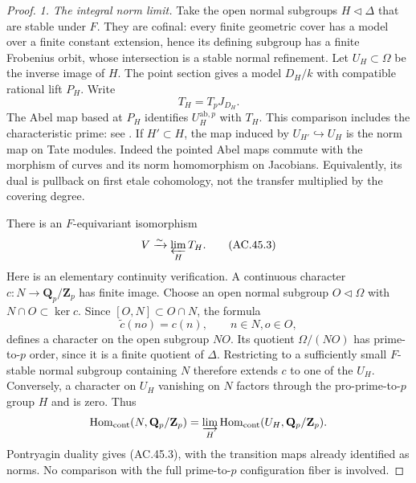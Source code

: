 \begin{proof}
\emph{1. The integral norm limit.}
Take the open normal subgroups $H\triangleleft\Delta$
that are stable under $F$. They are cofinal: every
finite geometric cover has a model over a finite
constant extension, hence its defining subgroup has
a finite Frobenius orbit, whose intersection is a
stable normal refinement. Let $U_H\subset\Omega$
be the inverse image of $H$. The point section
gives a model $D_H/k$ with compatible rational lift
$P_H$. Write
\[
                    T_H=T_pJ_{D_H}.
\]
The Abel map based at $P_H$ identifies
$U_H^{\mathrm{ab},p}$ with $T_H$. This comparison
includes the characteristic prime: see
\cite[Proposition~9.1, Lemmas~9.4--9.5 and
Corollary~9.6]{AC_MilneJac1986}.
If $H'\subset H$, the map induced by
$U_{H'}\hookrightarrow U_H$ is the norm map on
Tate modules. Indeed the pointed Abel maps commute
with the morphism of curves and its norm homomorphism
on Jacobians. Equivalently, its dual is pullback on
first etale cohomology, not the transfer multiplied
by the covering degree.

There is an $F$-equivariant isomorphism
\[
                 V\xrightarrow{\sim}\varprojlim_H T_H.
                                                        \tag{AC.45.3}
\]
Here is an elementary continuity verification. A
continuous character $c:N\to\mathbf Q_p/\mathbf Z_p$
has finite image. Choose an open normal subgroup
$O\triangleleft\Omega$ with $N\cap O\subset\ker c$.
Since $[O,N]\subset O\cap N$, the formula
\[
               \widetilde c(no)=c(n),\qquad n\in N, o\in O,
\]
defines a character on the open subgroup $NO$.
Its quotient $\Omega/(NO)$ has prime-to-$p$ order,
since it is a finite quotient of $\Delta$.
Restricting to a sufficiently small $F$-stable normal
subgroup containing $N$ therefore extends $c$ to
one of the $U_H$. Conversely, a character on $U_H$
vanishing on $N$ factors through the pro-prime-to-$p$
group $H$ and is zero. Thus
\[
 \operatorname{Hom}_{\mathrm{cont}}(N,\mathbf Q_p/\mathbf Z_p)
  =\varinjlim_H
    \operatorname{Hom}_{\mathrm{cont}}(U_H,\mathbf Q_p/\mathbf Z_p).
\]
Pontryagin duality gives (AC.45.3), with the transition
maps already identified as norms. No comparison with
the full prime-to-$p$ configuration fiber is involved.


\end{proof}
